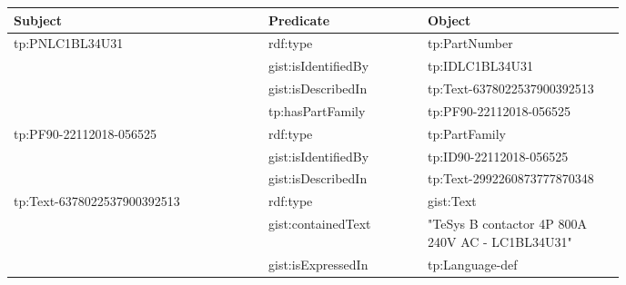 \begin{figure}[H]
\begin{subfigure}{\textwidth}
  \centering

  \begin{table}[H]
	  \begin{tabular}{|p{0.40\linewidth}|p{0.25\linewidth}|p{0.31\linewidth}|}
		  \hline
		  \textbf{Subject} & \textbf{Predicate} & \textbf{Object} \\
		  \hline
		  \multirow{4}{*}{tp:PNLC1BL34U31} & rdf:type & tp:PartNumber \\
		   & gist:isIdentifiedBy & tp:IDLC1BL34U31 \\
		   & gist:isDescribedIn & tp:Text-6378022537900392513 \\
		   & tp:hasPartFamily & tp:PF90-22112018-056525 \\
		  \hline
		  \multirow{3}{*}{tp:PF90-22112018-056525} & rdf:type & tp:PartFamily \\
		   & gist:isIdentifiedBy & tp:ID90-22112018-056525 \\
		   & gist:isDescribedIn & tp:Text-2992260873777870348 \\
		  \hline
		  \multirow{3}{*}{tp:Text-6378022537900392513} & rdf:type & gist:Text \\
		   & gist:containedText & "TeSys B contactor 4P 800A 240V AC - LC1BL34U31" \\
		   & gist:isExpressedIn & tp:Language-def \\
		  \hline
	  \end{tabular}
	\end{table}
\end{subfigure}
\end{figure}

